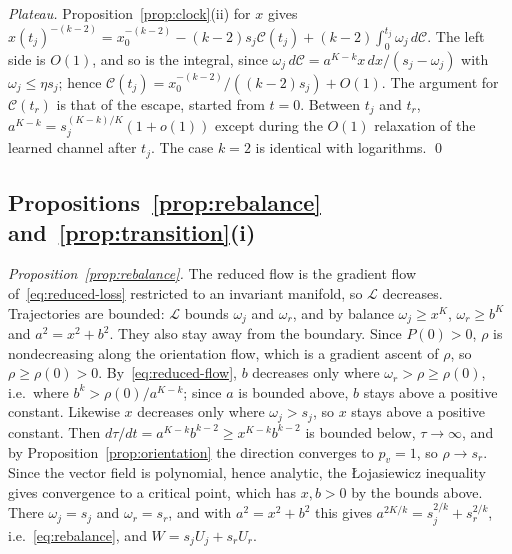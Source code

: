 \documentclass[11pt]{article}
\newcommand{\Clk}{\mathcal{C}}
\theoremstyle{definition}
\numberwithin{equation}{section}
\begin{document}
\emph{Plateau.} Proposition~\ref{prop:clock}(ii) for $x$ gives $x(t_j)^{-(k-2)}=x_0^{-(k-2)}-(k-2)s_j\Clk(t_j)+(k-2)\int_0^{t_j}\omega_j\,d\Clk$. The left side is $O(1)$, and so is the integral, since $\omega_j\,d\Clk=a^{K-k}x\,dx/(s_j-\omega_j)$ with $\omega_j\le\eta s_j$; hence $\Clk(t_j)=x_0^{-(k-2)}/((k-2)s_j)+O(1)$. The argument for $\Clk(t_r)$ is that of the escape, started from $t=0$. Between $t_j$ and $t_r$, $a^{K-k}=s_j^{(K-k)/K}(1+o(1))$ except during the $O(1)$ relaxation of the learned channel after $t_j$. The case $k=2$ is identical with logarithms. \qed

\subsection{Propositions~\ref{prop:rebalance} and~\ref{prop:transition}(i)}\label{app:transition}

\emph{Proposition~\ref{prop:rebalance}.} The reduced flow is the gradient flow of~\eqref{eq:reduced-loss} restricted to an invariant manifold, so $\mathcal L$ decreases. Trajectories are bounded: $\mathcal L$ bounds $\omega_j$ and $\omega_r$, and by balance $\omega_j\ge x^K$, $\omega_r\ge b^K$ and $a^2=x^2+b^2$. They also stay away from the boundary. Since $P(0)>0$, $\rho$ is nondecreasing along the orientation flow, which is a gradient ascent of $\rho$, so $\rho\ge\rho(0)>0$. By~\eqref{eq:reduced-flow}, $b$ decreases only where $\omega_r>\rho\ge\rho(0)$, i.e.\ where $b^k>\rho(0)/a^{K-k}$; since $a$ is bounded above, $b$ stays above a positive constant. Likewise $x$ decreases only where $\omega_j>s_j$, so $x$ stays above a positive constant. Then $d\tau/dt=a^{K-k}b^{k-2}\ge x^{K-k}b^{k-2}$ is bounded below, $\tau\to\infty$, and by Proposition~\ref{prop:orientation} the direction converges to $p_v=1$, so $\rho\to s_r$. Since the vector field is polynomial, hence analytic, the Łojasiewicz inequality gives convergence to a critical point, which has $x,b>0$ by the bounds above. There $\omega_j=s_j$ and $\omega_r=s_r$, and with $a^2=x^2+b^2$ this gives $a^{2K/k}=s_j^{2/k}+s_r^{2/k}$, i.e.~\eqref{eq:rebalance}, and $W=s_jU_j+s_rU_r$.
\end{document}
